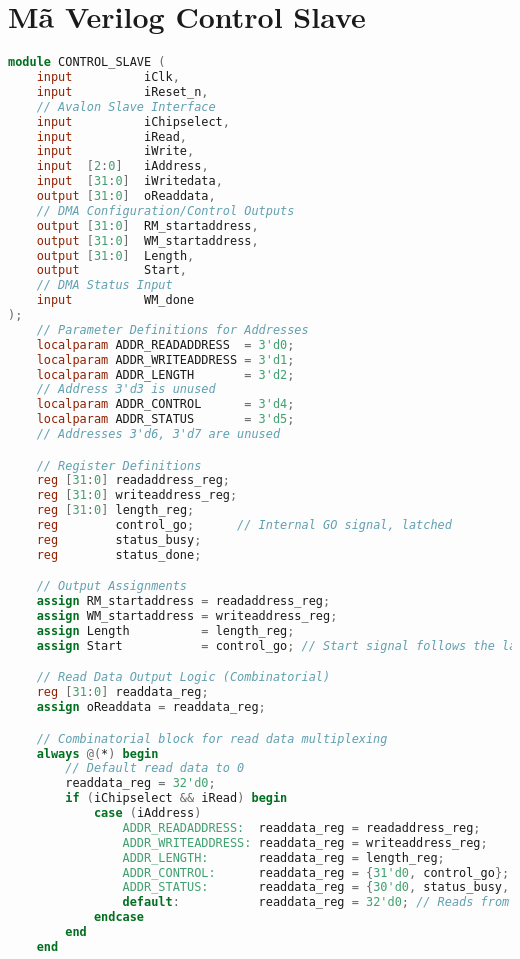 \section{Mã Verilog Control Slave}
\label{app:verilog_control_slave}
\begin{lstlisting}[language=Verilog, caption={CONTROL\_SLAVE.v - Avalon Slave for Control/Status}, label=lst:verilog_controlslave]
module CONTROL_SLAVE (
    input          iClk,
    input          iReset_n,
    // Avalon Slave Interface
    input          iChipselect,
    input          iRead,
    input          iWrite,
    input  [2:0]   iAddress,
    input  [31:0]  iWritedata,
    output [31:0]  oReaddata,
    // DMA Configuration/Control Outputs
    output [31:0]  RM_startaddress,
    output [31:0]  WM_startaddress,
    output [31:0]  Length,
    output         Start,
    // DMA Status Input
    input          WM_done
);
    // Parameter Definitions for Addresses
    localparam ADDR_READADDRESS  = 3'd0;
    localparam ADDR_WRITEADDRESS = 3'd1;
    localparam ADDR_LENGTH       = 3'd2;
    // Address 3'd3 is unused
    localparam ADDR_CONTROL      = 3'd4;
    localparam ADDR_STATUS       = 3'd5;
    // Addresses 3'd6, 3'd7 are unused

    // Register Definitions
    reg [31:0] readaddress_reg;
    reg [31:0] writeaddress_reg;
    reg [31:0] length_reg;
    reg        control_go;      // Internal GO signal, latched
    reg        status_busy;
    reg        status_done;

    // Output Assignments
    assign RM_startaddress = readaddress_reg;
    assign WM_startaddress = writeaddress_reg;
    assign Length          = length_reg;
    assign Start           = control_go; // Start signal follows the latched GO bit

    // Read Data Output Logic (Combinatorial)
    reg [31:0] readdata_reg;
    assign oReaddata = readdata_reg;

    // Combinatorial block for read data multiplexing
    always @(*) begin
        // Default read data to 0
        readdata_reg = 32'd0;
        if (iChipselect && iRead) begin
            case (iAddress)
                ADDR_READADDRESS:  readdata_reg = readaddress_reg;
                ADDR_WRITEADDRESS: readdata_reg = writeaddress_reg;
                ADDR_LENGTH:       readdata_reg = length_reg;
                ADDR_CONTROL:      readdata_reg = {31'd0, control_go};      // Return current GO bit status
                ADDR_STATUS:       readdata_reg = {30'd0, status_busy, status_done}; // Return Busy and Done status
                default:           readdata_reg = 32'd0; // Reads from unused addresses return 0
            endcase
        end
    end


\end{lstlisting}
